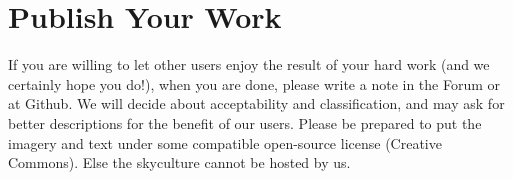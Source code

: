 \section{Publish Your Work}
\label{sec:skyculture:publish}

If you are willing to let other users enjoy the result of your hard
work (and we certainly hope you do!), when you are done, please write
a note in the Forum or at Github. We will decide about acceptability
and classification, and may ask for better descriptions for the
benefit of our users.  Please be prepared to put the imagery and text
under some compatible open-source license (Creative Commons). Else the
skyculture cannot be hosted by us.



